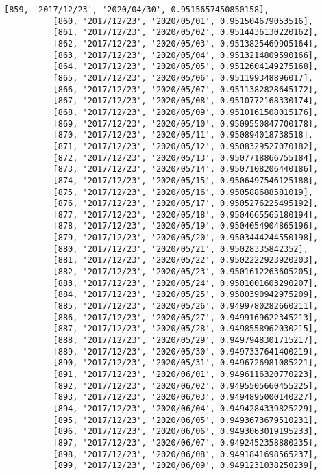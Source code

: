 \documentclass[11pt]{article}
\begin{document}
\begin{Verbatim}[commandchars=\\\{\}]
          [859, '2017/12/23', '2020/04/30', 0.9515657450850158],
          [860, '2017/12/23', '2020/05/01', 0.951504679053516],
          [861, '2017/12/23', '2020/05/02', 0.9514436130220162],
          [862, '2017/12/23', '2020/05/03', 0.9513825469905164],
          [863, '2017/12/23', '2020/05/04', 0.9513214809590166],
          [864, '2017/12/23', '2020/05/05', 0.9512604149275168],
          [865, '2017/12/23', '2020/05/06', 0.951199348896017],
          [866, '2017/12/23', '2020/05/07', 0.9511382828645172],
          [867, '2017/12/23', '2020/05/08', 0.9510772168330174],
          [868, '2017/12/23', '2020/05/09', 0.9510161508015176],
          [869, '2017/12/23', '2020/05/10', 0.9509550847700178],
          [870, '2017/12/23', '2020/05/11', 0.950894018738518],
          [871, '2017/12/23', '2020/05/12', 0.9508329527070182],
          [872, '2017/12/23', '2020/05/13', 0.9507718866755184],
          [873, '2017/12/23', '2020/05/14', 0.9507108206440186],
          [874, '2017/12/23', '2020/05/15', 0.9506497546125188],
          [875, '2017/12/23', '2020/05/16', 0.950588688581019],
          [876, '2017/12/23', '2020/05/17', 0.9505276225495192],
          [877, '2017/12/23', '2020/05/18', 0.9504665565180194],
          [878, '2017/12/23', '2020/05/19', 0.9504054904865196],
          [879, '2017/12/23', '2020/05/20', 0.9503444244550198],
          [880, '2017/12/23', '2020/05/21', 0.95028335842352],
          [881, '2017/12/23', '2020/05/22', 0.9502222923920203],
          [882, '2017/12/23', '2020/05/23', 0.9501612263605205],
          [883, '2017/12/23', '2020/05/24', 0.9501001603290207],
          [884, '2017/12/23', '2020/05/25', 0.9500390942975209],
          [885, '2017/12/23', '2020/05/26', 0.9499780282660211],
          [886, '2017/12/23', '2020/05/27', 0.9499169622345213],
          [887, '2017/12/23', '2020/05/28', 0.9498558962030215],
          [888, '2017/12/23', '2020/05/29', 0.9497948301715217],
          [889, '2017/12/23', '2020/05/30', 0.9497337641400219],
          [890, '2017/12/23', '2020/05/31', 0.9496726981085221],
          [891, '2017/12/23', '2020/06/01', 0.9496116320770223],
          [892, '2017/12/23', '2020/06/02', 0.9495505660455225],
          [893, '2017/12/23', '2020/06/03', 0.9494895000140227],
          [894, '2017/12/23', '2020/06/04', 0.9494284339825229],
          [895, '2017/12/23', '2020/06/05', 0.9493673679510231],
          [896, '2017/12/23', '2020/06/06', 0.9493063019195233],
          [897, '2017/12/23', '2020/06/07', 0.9492452358880235],
          [898, '2017/12/23', '2020/06/08', 0.9491841698565237],
          [899, '2017/12/23', '2020/06/09', 0.9491231038250239],

\end{Verbatim}
\end{document}
